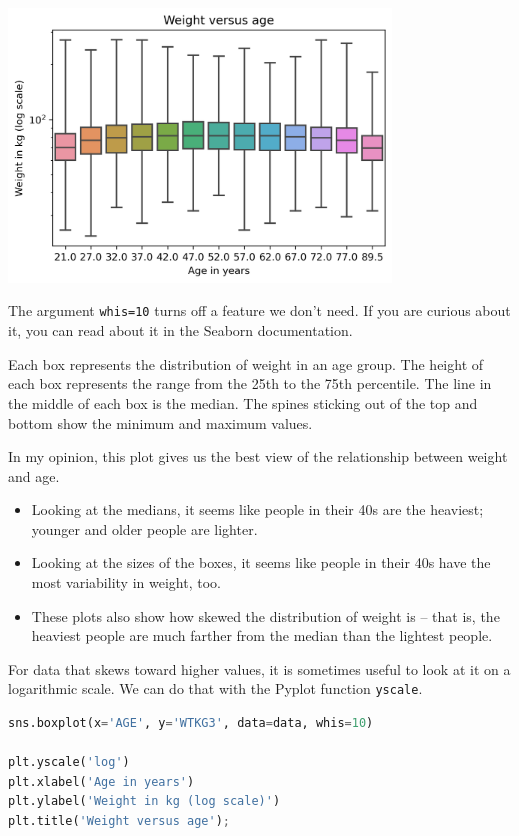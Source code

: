 \begin{center}
\includegraphics[width=4in]{chapters/09_relationships_files/09_relationships_47_0.png}
\end{center}

The argument \passthrough{\lstinline!whis=10!} turns off a feature we
don't need. If you are curious about it, you can read about it in the
Seaborn documentation.

Each box represents the distribution of weight in an age group. The
height of each box represents the range from the 25th to the 75th
percentile. The line in the middle of each box is the median. The spines
sticking out of the top and bottom show the minimum and maximum values.

In my opinion, this plot gives us the best view of the relationship
between weight and age.

\begin{itemize}
\item
  Looking at the medians, it seems like people in their 40s are the
  heaviest; younger and older people are lighter.
\item
  Looking at the sizes of the boxes, it seems like people in their 40s
  have the most variability in weight, too.
\item
  These plots also show how skewed the distribution of weight is -- that
  is, the heaviest people are much farther from the median than the
  lightest people.
\end{itemize}

For data that skews toward higher values, it is sometimes useful to look
at it on a logarithmic scale. We can do that with the Pyplot function
\passthrough{\lstinline!yscale!}.

\begin{lstlisting}[language=Python,style=source]
sns.boxplot(x='AGE', y='WTKG3', data=data, whis=10)

plt.yscale('log')
plt.xlabel('Age in years')
plt.ylabel('Weight in kg (log scale)')
plt.title('Weight versus age');
\end{lstlisting}

